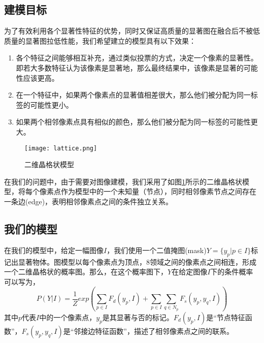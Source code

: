 \subsection{建模目标}
为了有效利用各个显著性特征的优势，同时又保证高质量的显著图在融合后不被低质量的显著图拉低性能，我们希望建立的模型具有以下效果：
\begin{enumerate}
\item 各个特征之间能够相互补充，通过类似投票的方式，决定一个像素的显著性。即若大多数特征认为该像素是显著地，那么最终结果中，该像素是显著的可能性应该更高。
\item 在一个特征中，如果两个像素点的显著值相差很大，那么他们被分配为同一标签的可能性更小。
\item 如果两个相邻像素点具有相似的颜色，那么他们被分配为同一标签的可能性更大。
\end{enumerate}

\begin{figure}
\centering
\texttt{[image: lattice.png]}
\caption{二维晶格状模型}\label{fig:lattice}
\end{figure}

在我们的问题中，由于需要对图像建模，我们采用了如图\ref{fig:lattice}所示的二维晶格状模型，将每个像素点作为模型中的一个未知量（节点），同时相邻像素节点之间存在一条边(edge)，表明相邻像素点之间的条件独立关系。

\subsection{我们的模型}
在我们的模型中，给定一幅图像$I$，我们使用一个二值掩图(mask)$Y=\{y_p|p\in I\}$标记出显著物体。图模型以每个像素点为顶点，8领域之间的像素点之间相连，形成一个二维晶格状的概率图。那么，在这个概率图下，$Y$在给定图像$I$下的条件概率可以写为，
\begin{equation}
P(Y|I) = \frac{1}{Z}exp(\sum_{p\in I}F_d(y_p, I) + \sum_{p\in I}\sum_{q\in N_p}F_s(y_p,y_q,I) )
\end{equation}
其中$p$代表$I$中的一个像素点，$y_p$是其显著与否的标记。$F_d(y_p, I)$是“节点特征函数”，$F_s(y_p,y_q,I)$是“邻接边特征函数”，描述了相邻像素点之间的联系。


